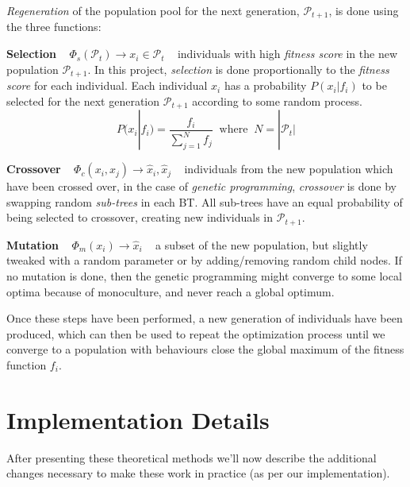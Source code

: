 \documentclass[a4paper, twocolumn]{article}
\begin{document}
	\emph{Regeneration} of the population pool for the next generation, \(\mathcal{P}_{t+1}\), is done using the three functions:

    \vspace{1em}

    \textbf{Selection} ~ \(\Phi_s(\mathcal{P}_t) \rightarrow x_i \in \mathcal{P}_t\) ~ individuals with high \emph{fitness score} in the new population \(\mathcal{P}_{t+1}\). In this project, \emph{selection} is done proportionally to the \emph{fitness score} for each individual. Each individual \(x_i\) has a probability \(P(x_i|f_i)\) to be selected for the next generation \(\mathcal{P}_{t+1}\) according to some random process.
    \begin{equation*}
        P(x_i|f_i) = \frac{f_i}{\sum_{j = 1}^{N}f_j} \; \; \text{where} \; \; N = |\mathcal{P}_t|
    \end{equation*}

    \textbf{Crossover} ~ \(\Phi_c(x_i,x_j) \rightarrow \hat{x}_i,\hat{x}_j\) ~ individuals from the new population which have been crossed over, in the case of \emph{genetic programming}, \emph{crossover} is done by swapping random \emph{sub-trees} in each BT. All sub-trees have an equal probability of being selected to crossover, creating new individuals in \(\mathcal{P}_{t+1}\).

    \vspace{1em}

    \textbf{Mutation} ~ \(\Phi_m(x_i) \rightarrow \hat{x}_i\) ~ a subset of the new population, but slightly tweaked with a random parameter or by adding/removing random child nodes. If no mutation is done, then the genetic programming might converge to some local optima because of monoculture, and never reach a global optimum.

    \vspace{1em}

    Once these steps have been performed, a new generation of individuals have been produced, which can then be used to repeat the optimization process until we converge to a population with behaviours close the global maximum of the fitness function \(f_i\).


    \section{Implementation Details} \label{sec:implementation_details}

        After presenting these theoretical methods we'll now describe the additional changes necessary to make these work in practice (as per our implementation).
\end{document}

